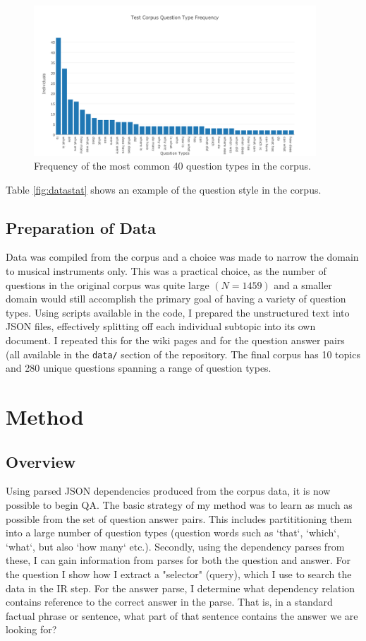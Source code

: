 \documentclass[twoside]{article}
\begin{document}
\begin{figure}
\centering
\caption{Frequency of the most common 40 question types in the corpus. \label{fig:qtypes}}
\includegraphics[width=400px]{figures/qtypes-test.png}
\end{figure}

Table \ref{fig:datastat} shows an example of the question style in the corpus.

\subsection{Preparation of Data}

Data was compiled from the corpus and a choice was made to narrow the domain to musical instruments only.  This was a practical choice, as the number of questions in the original corpus was quite large $(N=1459)$ and a smaller domain would still accomplish the primary goal of having a variety of question types.  Using scripts available in the code, I prepared the unstructured text into JSON files, effectively splitting off each individual subtopic into its own document.  I repeated this for the wiki pages and for the question answer pairs (all available in the \texttt{data/} section of the repository.  The final corpus has 10 topics and 280 unique questions spanning a range of question types.

\section{Method}

\subsection{Overview}

Using parsed JSON dependencies produced from the corpus data, it is now possible to begin QA.  The basic strategy of my method was to learn as much as possible from the set of question answer pairs.  This includes partititioning them into a large number of question types (question words such as `that`, `which`, `what`, but also `how many` etc.).  Secondly, using the dependency parses from these, I can gain information from parses for both the question and answer.  For the question I show how I extract a "selector" (query), which I use to search the data in the IR step.  For the answer parse, I determine what dependency relation contains reference to the correct answer in the parse.  That is, in a standard factual phrase or sentence, what part of that sentence contains the answer we are looking for?
\end{document}
